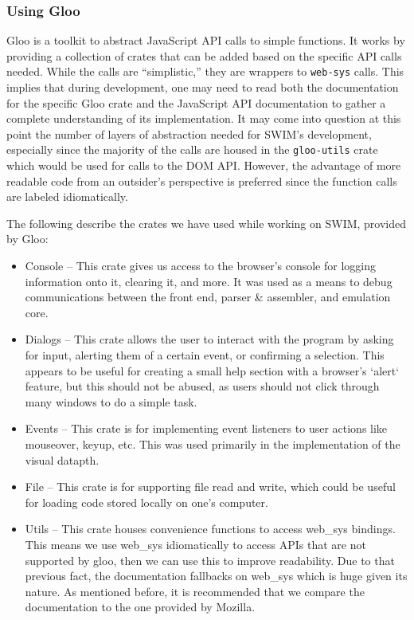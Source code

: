 \documentclass[
    paper=letter,
    parskip=half,
    fontsize=12pt,
    titlepage=firstiscover,
    toc=bibliography,
    numbers=endperiod
]{scrartcl}
\providecommand{\tightlist}{%
  \setlength{\itemsep}{0pt}\setlength{\parskip}{0pt}}
\begin{document}
\subsubsection{Using Gloo}

Gloo \cite{gloo} is a toolkit to abstract JavaScript API calls to simple
functions. It works by providing a collection of crates that can be
added based on the specific API calls needed. While the calls are
``simplistic,'' they are wrappers to \texttt{web-sys} calls. This
implies that during development, one may need to read both the
documentation for the specific Gloo crate and the JavaScript API
documentation to gather a complete understanding of its implementation.
It may come into question at this point the number of layers of
abstraction needed for SWIM's development, especially since the majority
of the calls are housed in the \texttt{gloo-utils} crate which would be
used for calls to the DOM API. However, the advantage of more readable
code from an outsider's perspective is preferred since the function
calls are labeled idiomatically.

The following describe the crates we have used while working on SWIM,
provided by Gloo:

\begin{itemize}
    \tightlist
    \item Console -- This crate gives us access to the browser's console for
          logging information onto it, clearing it, and more. It was used as a
          means to debug communications between the front end, parser \&
          assembler, and emulation core.
    \item Dialogs -- This crate allows the user to interact with the program by
          asking for input, alerting them of a certain event, or confirming a
          selection. This appears to be useful for creating a small help section
          with a browser's `alert` feature, but this should not be abused, as
          users should not click through many windows to do a simple task.
    \item Events -- This crate is for implementing event listeners to user actions
          like mouseover, keyup, etc. This was used primarily in the
          implementation of the visual datapth.
    \item File -- This crate is for supporting file read and write, which could be
          useful for loading code stored locally on one's computer.
    \item Utils -- This crate houses convenience functions to access web\_sys
          bindings. This means we use web\_sys idiomatically to access APIs that
          are not supported by gloo, then we can use this to improve readability.
          Due to that previous fact, the documentation fallbacks on web\_sys which
          is huge given its nature. As mentioned before, it is recommended that we
          compare the documentation to the one provided by Mozilla.
\end{itemize}
\end{document}
